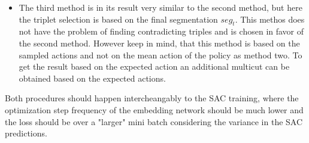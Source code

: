\begin{itemize}
 	\item The third method is in its result very similar to the second method, but here the triplet selection is based on the final segmentation $seg_t$. This methos does not have the problem of finding contradicting triples and is chosen in favor of the second method. However keep in mind, that this method is based on the sampled actions and not on the mean action of the policy as method two. To get the result based on the expected action an additional multicut can be obtained based on the expected actions.
\end{itemize}
Both procedures should happen intercheangably to the SAC training, where the optimization step frequency of the embedding network should be much lower and the loss should be over a "larger" mini batch considering the variance in the SAC predictions.